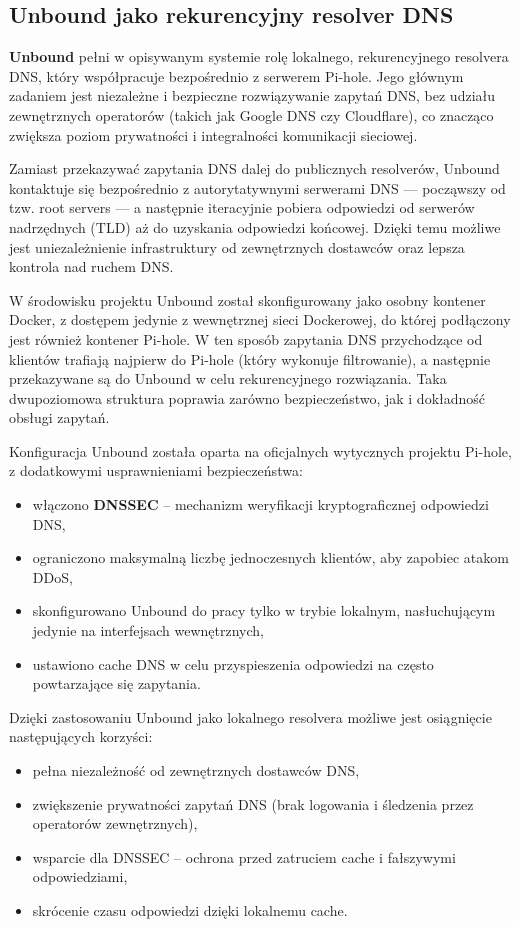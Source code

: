 \documentclass[
    left=2.5cm,         %
    right=2.5cm,        %
    top=2.5cm,          %
    bottom=3cm,         %
    bindingoffset=6mm,  %
    nohyphenation=true %
]{eiti/eiti-thesis} %
\begin{document}
\subsection{Unbound jako rekurencyjny resolver DNS}

\textbf{Unbound} pełni w opisywanym systemie rolę lokalnego, rekurencyjnego resolvera DNS, który współpracuje bezpośrednio z serwerem Pi-hole. Jego głównym zadaniem jest niezależne i bezpieczne rozwiązywanie zapytań DNS, bez udziału zewnętrznych operatorów (takich jak Google DNS czy Cloudflare), co znacząco zwiększa poziom prywatności i integralności komunikacji sieciowej.

Zamiast przekazywać zapytania DNS dalej do publicznych resolverów, Unbound kontaktuje się bezpośrednio z autorytatywnymi serwerami DNS — począwszy od tzw. root servers — a następnie iteracyjnie pobiera odpowiedzi od serwerów nadrzędnych (TLD) aż do uzyskania odpowiedzi końcowej. Dzięki temu możliwe jest uniezależnienie infrastruktury od zewnętrznych dostawców oraz lepsza kontrola nad ruchem DNS.

W środowisku projektu Unbound został skonfigurowany jako osobny kontener Docker, z dostępem jedynie z wewnętrznej sieci Dockerowej, do której podłączony jest również kontener Pi-hole. W ten sposób zapytania DNS przychodzące od klientów trafiają najpierw do Pi-hole (który wykonuje filtrowanie), a następnie przekazywane są do Unbound w celu rekurencyjnego rozwiązania. Taka dwupoziomowa struktura poprawia zarówno bezpieczeństwo, jak i dokładność obsługi zapytań.

Konfiguracja Unbound została oparta na oficjalnych wytycznych projektu Pi-hole, z dodatkowymi usprawnieniami bezpieczeństwa:
\begin{itemize}
    \item włączono \textbf{DNSSEC} – mechanizm weryfikacji kryptograficznej odpowiedzi DNS,
    \item ograniczono maksymalną liczbę jednoczesnych klientów, aby zapobiec atakom DDoS,
    \item skonfigurowano Unbound do pracy tylko w trybie lokalnym, nasłuchującym jedynie na interfejsach wewnętrznych,
    \item ustawiono cache DNS w celu przyspieszenia odpowiedzi na często powtarzające się zapytania.
\end{itemize}

Dzięki zastosowaniu Unbound jako lokalnego resolvera możliwe jest osiągnięcie następujących korzyści:
\begin{itemize}
    \item pełna niezależność od zewnętrznych dostawców DNS,
    \item zwiększenie prywatności zapytań DNS (brak logowania i śledzenia przez operatorów zewnętrznych),
    \item wsparcie dla DNSSEC – ochrona przed zatruciem cache i fałszywymi odpowiedziami,
    \item skrócenie czasu odpowiedzi dzięki lokalnemu cache.
\end{itemize}
\end{document}
